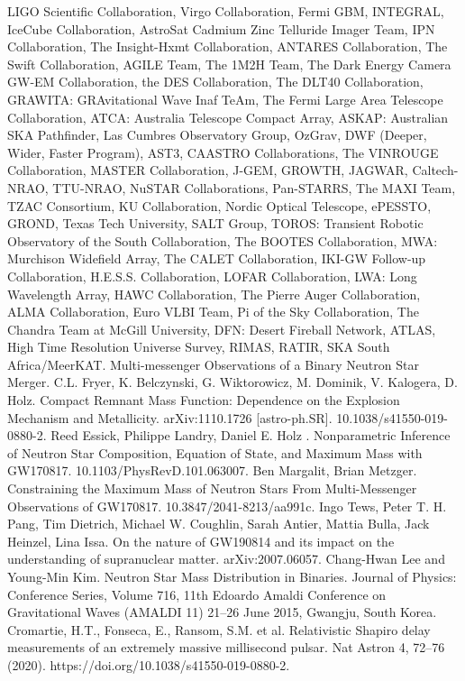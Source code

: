 \documentclass[binding=0.6cm, LaM]{sapthesis}
\begin{document}
\begin{thebibliography}{500}
	 LIGO Scientific Collaboration, Virgo Collaboration, Fermi GBM, INTEGRAL, IceCube Collaboration, AstroSat Cadmium Zinc Telluride Imager Team, IPN Collaboration, The Insight-Hxmt Collaboration, ANTARES Collaboration, The Swift Collaboration, AGILE Team, The 1M2H Team, The Dark Energy Camera GW-EM Collaboration, the DES Collaboration, The DLT40 Collaboration, GRAWITA: GRAvitational Wave Inaf TeAm, The Fermi Large Area Telescope Collaboration, ATCA: Australia Telescope Compact Array, ASKAP: Australian SKA Pathfinder, Las Cumbres Observatory Group, OzGrav, DWF (Deeper, Wider, Faster Program), AST3, CAASTRO Collaborations, The VINROUGE Collaboration, MASTER Collaboration, J-GEM, GROWTH, JAGWAR, Caltech- NRAO, TTU-NRAO, NuSTAR Collaborations, Pan-STARRS, The MAXI Team, TZAC Consortium, KU Collaboration, Nordic Optical Telescope, ePESSTO, GROND, Texas Tech University, SALT Group, TOROS: Transient Robotic Observatory of the South Collaboration, The BOOTES Collaboration, MWA: Murchison Widefield Array, The CALET Collaboration, IKI-GW Follow-up Collaboration, H.E.S.S. Collaboration, LOFAR Collaboration, LWA: Long Wavelength Array, HAWC Collaboration, The Pierre Auger Collaboration, ALMA Collaboration, Euro VLBI Team, Pi of the Sky Collaboration, The Chandra Team at McGill University, DFN: Desert Fireball Network, ATLAS, High Time Resolution Universe Survey, RIMAS, RATIR, SKA South Africa/MeerKAT. Multi-messenger Observations of a Binary Neutron Star Merger.
	 C.L. Fryer, K. Belczynski, G. Wiktorowicz, M. Dominik, V. Kalogera, D. Holz. Compact Remnant Mass Function: Dependence on the Explosion Mechanism and Metallicity. arXiv:1110.1726 [astro-ph.SR].
	 10.1038/s41550-019-0880-2.
	 Reed Essick, Philippe Landry, Daniel E. Holz . Nonparametric Inference of Neutron Star Composition, Equation of State, and Maximum Mass with GW170817. 10.1103/PhysRevD.101.063007.
	 Ben Margalit, Brian Metzger. Constraining the Maximum Mass of Neutron Stars From Multi-Messenger Observations of GW170817.  10.3847/2041-8213/aa991c.
	 Ingo Tews, Peter T. H. Pang, Tim Dietrich, Michael W. Coughlin, Sarah Antier, Mattia Bulla, Jack Heinzel, Lina Issa. On the nature of GW190814 and its impact on the understanding of supranuclear matter. arXiv:2007.06057.
	 Chang-Hwan Lee and Young-Min Kim. Neutron Star Mass Distribution in Binaries. Journal of Physics: Conference Series, Volume 716, 11th Edoardo Amaldi Conference on Gravitational Waves (AMALDI 11) 21–26 June 2015, Gwangju, South Korea.
	 Cromartie, H.T., Fonseca, E., Ransom, S.M. et al. Relativistic Shapiro delay measurements of an extremely massive millisecond pulsar. Nat Astron 4, 72–76 (2020). https://doi.org/10.1038/s41550-019-0880-2.

\end{thebibliography}
\end{document}
